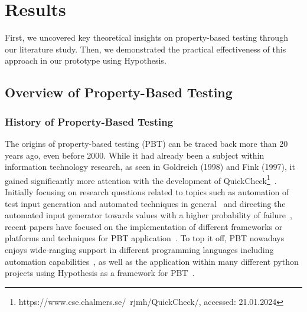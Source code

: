 \documentclass[runningheads]{llncs}
\begin{document}
\section{Results}
First, we uncovered key theoretical insights on property-based testing through our literature study. Then, we demonstrated the practical effectiveness of this approach in our prototype using Hypothesis.

\subsection{Overview of Property-Based Testing}
\subsubsection{History of Property-Based Testing}
The origins of property-based testing (PBT) can be traced back more than 20 years ago, even before 2000. While it had already been a subject within information technology research, as seen in Goldreich (1998) and Fink (1997), it gained significantly more attention with the development of QuickCheck\footnote{https://www.cse.chalmers.se/~rjmh/QuickCheck/, accessed: 21.01.2024}~\cite{Shi2023,Fink1997,MacIver2019,Honarvar2020}. Initially focusing on research questions related to topics such as automation of test input generation and automated techniques in general~\cite{Fink1997} and directing the automated input generator towards values with a higher probability of failure~\cite{Loescher2017}, recent papers have focused on the implementation of different frameworks or platforms and techniques for PBT application~\cite{Padhye2019,Honarvar2020,Shi2023,Corgozinho2023}. To top it off, PBT nowadays enjoys wide-ranging support in different programming languages including automation capabilities~\cite{Chen2022,Padhye2019,Honarvar2020,ElazarMittelman2023,Shi2023}, as well as the application within many different python projects using Hypothesis as a framework for PBT~\cite{Corgozinho2023}.
\end{document}
